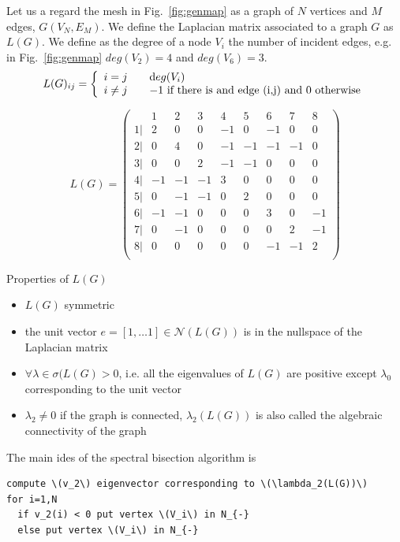 Let us a regard the mesh in Fig.~\ref{fig:genmap} as a graph of \(N\) vertices and \(M\) edges, \(G(V_N,E_M)\). We define the Laplacian matrix associated to a graph \(G\) as \(L(G)\). We define as the degree of a node \(V_i\) the number of incident edges, e.g. in Fig.~\ref{fig:genmap} \(deg(V_2)=4\) and \(deg(V_6)=3\).
\begin{equation}
L(G)_{ij}= \left\{
  \begin{array}{l l}
    i=j & \quad \mathrm deg(V_i)\\
    i\neq j & \quad -1 \text{ if there is and edge (i,j) and } 0 \text{ otherwise}
  \end{array} \right .
\end{equation}

\begin{equation}
L(G)= \begin{pmatrix} 
  &1 & 2 & 3 & 4 & 5 & 6 & 7 & 8\\ 
  \hline
1| &2 & 0 & 0 & -1 & 0 & -1 & 0 & 0\\ 
2| &0 & 4 & 0 & -1 & -1 & -1 & -1 & 0\\  
3| &0 & 0 & 2 & -1 & -1 & 0 & 0 & 0\\ 
4| &-1 & -1 & -1 & 3 & 0 & 0 & 0 & 0\\ 
5| &0 & -1 & -1 & 0 & 2 & 0 & 0 & 0\\ 
6| &-1 & -1 & 0 & 0 & 0 & 3 & 0 & -1\\ 
7| &0 & -1 & 0 & 0 & 0 & 0 & 2 & -1\\ 
8| &0 & 0 & 0 & 0 & 0 & -1 & -1 & 2\\  
\end{pmatrix}
\end{equation}

Properties of \(L(G)\)
\begin{itemize}
\item \(L(G)\) symmetric
\item the unit vector \(e=[1, \ldots 1]\in \mathcal{N}(L(G))\) is in the nullspace of the Laplacian matrix
\item \(\forall\lambda \in \sigma(L(G)>0\), i.e. all the eigenvalues of \(L(G)\) are positive except \(\lambda_0\) corresponding to the unit vector
\item \(\lambda_2\neq 0\) if the graph is connected, \(\lambda_2(L(G))\) is also called the algebraic connectivity of the graph
\end{itemize}

The main ides of the spectral bisection algorithm is
\begin{verbatim}
compute \(v_2\) eigenvector corresponding to \(\lambda_2(L(G))\)
for i=1,N
  if v_2(i) < 0 put vertex \(V_i\) in N_{-} 
  else put vertex \(V_i\) in N_{-} 
\end{verbatim}


